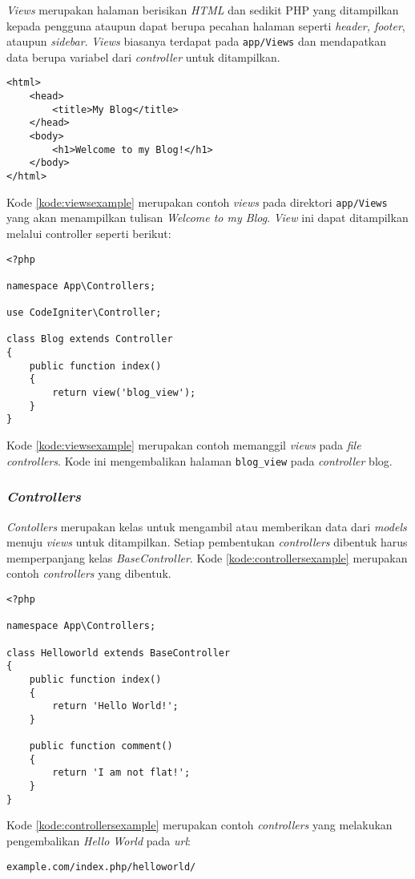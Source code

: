 \textit{Views} merupakan halaman berisikan \textit{HTML} dan sedikit PHP yang ditampilkan kepada pengguna ataupun dapat berupa pecahan halaman seperti \textit{header, footer}, ataupun \textit{sidebar}. \textit{Views} biasanya terdapat pada \verb|app/Views| dan mendapatkan data berupa variabel dari \textit{controller} untuk ditampilkan.

\begin{lstlisting}[caption=Contoh \textit{Views},label=kode:viewsexample]
<html>
    <head>
        <title>My Blog</title>
    </head>
    <body>
        <h1>Welcome to my Blog!</h1>
    </body>
</html>
\end{lstlisting}

Kode \ref{kode:viewsexample} merupakan contoh \textit{views} pada direktori \verb|app/Views| yang akan menampilkan tulisan \textit{Welcome to my Blog}. \textit{View} ini dapat ditampilkan melalui controller seperti berikut:
\begin{lstlisting}[caption=Contoh \textit{Views},label=kode:viewsexample]
<?php

namespace App\Controllers;

use CodeIgniter\Controller;

class Blog extends Controller
{
    public function index()
    {
        return view('blog_view');
    }
}
\end{lstlisting}

Kode \ref{kode:viewsexample} merupakan contoh memanggil \textit{views} pada \textit{file controllers}. Kode ini mengembalikan halaman \texttt{blog\_view} pada \textit{controller} blog.

\subsubsection{\textit{Controllers}}

\textit{Contollers} merupakan kelas untuk mengambil atau memberikan data dari \textit{models} menuju \textit{views} untuk ditampilkan. Setiap pembentukan \textit{controllers} dibentuk harus memperpanjang kelas \textit{BaseController}. Kode \ref{kode:controllersexample} merupakan contoh \textit{controllers} yang dibentuk.

\begin{lstlisting}[caption=Contoh \textit{Controllers} pada \textit{CodeIgniter 4},label=kode:controllersexample]
<?php

namespace App\Controllers;

class Helloworld extends BaseController
{
    public function index()
    {
        return 'Hello World!';
    }

    public function comment()
    {
        return 'I am not flat!';
    }
}
\end{lstlisting}
Kode \ref{kode:controllersexample} merupakan contoh \textit{controllers} yang melakukan pengembalikan \textit{Hello World} pada \textit{url}:
\begin{center}
\verb|example.com/index.php/helloworld/|
\end{center}

